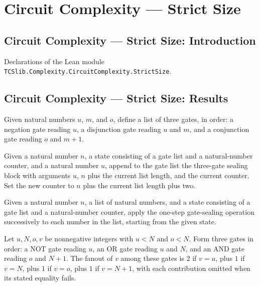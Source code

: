 \section{Circuit Complexity --- Strict Size}
\subsection*{Circuit Complexity --- Strict Size: Introduction}

Declarations of the Lean module \texttt{TCSlib.Complexity.CircuitComplexity.StrictSize}.

\subsection*{Circuit Complexity --- Strict Size: Results}

\begin{definition}
\label{BoolCircuit.sealTriple}
\leanok
{}
Given natural numbers $u$, $m$, and $o$, define a list of three gates, in order: a
negation gate reading $u$, a disjunction gate reading $u$ and $m$, and a conjunction
gate reading $o$ and $m+1$.
\end{definition}

\begin{definition}
\label{BoolCircuit.sealStep}
\leanok
{}
Given a natural number $n$, a state consisting of a gate list and a natural-number
counter, and a natural number $u$, append to the gate list the three-gate sealing block
with arguments $u$, $n$ plus the current list length, and the current counter. Set the
new counter to $n$ plus the current list length plus two.
\end{definition}

\begin{definition}
\label{BoolCircuit.sealGates}
\leanok
{}
Given a natural number $n$, a list of natural numbers, and a state consisting of a gate
list and a natural-number counter, apply the one-step gate-sealing operation
successively to each number in the list, starting from the given state.
\end{definition}

\begin{theorem}
\label{BoolCircuit.fanoutIn_sealTriple}
\leanok
{}
Let $u,N,o,v$ be nonnegative integers with $u<N$ and $o<N$. Form three gates in order: a
NOT gate reading $u$, an OR gate reading $u$ and $N$, and an AND gate reading $o$ and
$N+1$. The fanout of $v$ among these gates is $2$ if $v=u$, plus $1$ if $v=N$, plus $1$
if $v=o$, plus $1$ if $v=N+1$, with each contribution omitted when its stated equality
fails.
\end{theorem}

